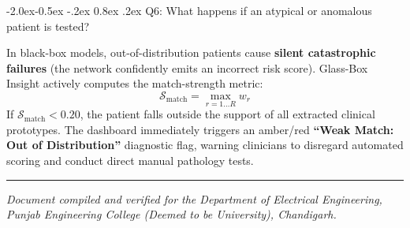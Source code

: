 \documentclass[10pt,a4paper]{article}
\makeatletter
\renewcommand\subsubsection{\@startsection{subsubsection}{3}{\z@}%
                                     {-2.0ex\@plus -0.5ex \@minus -.2ex}%
                                     {0.8ex \@plus .2ex}%
                                     {\normalfont\normalsize\bfseries\color{accent}}}
\makeatother
\begin{document}
\subsubsection{Q6: What happens if an atypical or anomalous patient is
tested?}\label{q6-what-happens-if-an-atypical-or-anomalous-patient-is-tested}

In black-box models, out-of-distribution patients cause \textbf{silent
catastrophic failures} (the network confidently emits an incorrect risk
score). Glass-Box Insight actively computes the match-strength metric:
\[\mathcal{S}_{\text{match}} = \max_{r=1 \dots R} w_r\] If
\(\mathcal{S}_{\text{match}} < 0.20\), the patient falls outside the
support of all extracted clinical prototypes. The dashboard immediately
triggers an amber/red \textbf{``Weak Match: Out of Distribution''}
diagnostic flag, warning clinicians to disregard automated scoring and
conduct direct manual pathology tests.

\begin{center}\rule{0.5\linewidth}{0.5pt}\end{center}

\emph{Document compiled and verified for the Department of Electrical
Engineering, Punjab Engineering College (Deemed to be University),
Chandigarh.}
\end{document}
